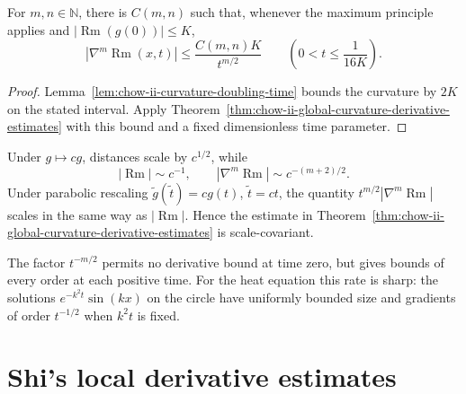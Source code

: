 \begin{corollary}
\label{cor:chow-ii-derivative-estimates-initial-curvature-bound}
For \(m,n\in\mathbb N\), there is \(C(m,n)\) such that, whenever the maximum
principle applies and \(|\operatorname{Rm}(g(0))|\le K\),
\[
|\nabla^m\operatorname{Rm}(x,t)|\le\frac{C(m,n)K}{t^{m/2}}
\qquad\left(0<t\le\frac1{16K}\right).
\]
\end{corollary}
\begin{proof}
\sketch Lemma~\ref{lem:chow-ii-curvature-doubling-time} bounds the curvature by
\(2K\) on the stated interval.  Apply
Theorem~\ref{thm:chow-ii-global-curvature-derivative-estimates} with this
bound and a fixed dimensionless time parameter.
\end{proof}

\begin{remark}
\label{rem:chow-ii-curvature-derivative-scaling}
Under \(g\mapsto cg\), distances scale by \(c^{1/2}\), while
\[
|\operatorname{Rm}|\sim c^{-1},\qquad |\nabla^m\operatorname{Rm}|\sim c^{-(m+2)/2}.
\]
Under parabolic rescaling \(\widetilde g(\widetilde t)=cg(t)\),
\(\widetilde t=ct\), the quantity
\(t^{m/2}|\nabla^m\operatorname{Rm}|\) scales in the same way as \(|\operatorname{Rm}|\).  Hence the
estimate in Theorem~\ref{thm:chow-ii-global-curvature-derivative-estimates}
is scale-covariant.
\end{remark}

\begin{remark}
\label{rem:chow-ii-derivative-estimates-smoothing}
The factor \(t^{-m/2}\) permits no derivative bound at time zero, but gives
bounds of every order at each positive time.  For the heat equation this rate
is sharp: the solutions \(e^{-k^2t}\sin(kx)\) on the circle have uniformly
bounded size and gradients of order \(t^{-1/2}\) when \(k^2t\) is fixed.
\end{remark}

\section{Shi's local derivative estimates}

